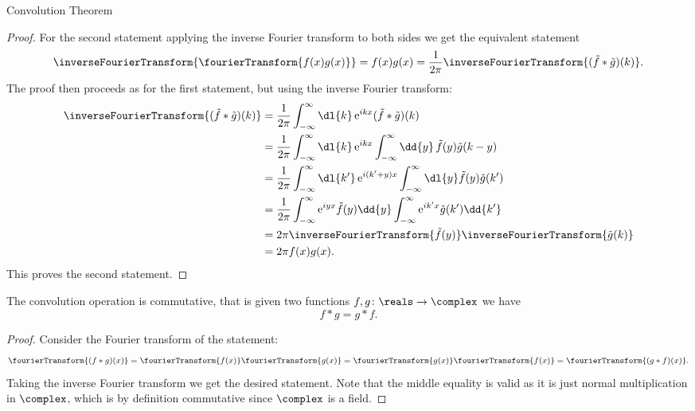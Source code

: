 \documentclass[fleqn]{NotesClass}
\newcommand*{\e}{\mathrm{e}}
\begin{document}
\begin{thm}{Convolution Theorem}{}
\begin{proof}
            For the second statement applying the inverse Fourier transform to both sides we get the equivalent statement
            \begin{equation}
                \inverseFourierTransform\{ \fourierTransform\{ f(x)g(x) \} \} = f(x)g(x) = \frac{1}{2\pi} \inverseFourierTransform\{ (\tilde{f} \ast \tilde{g})(k) \}.
            \end{equation}
            The proof then proceeds as for the first statement, but using the inverse Fourier transform:
            \begin{align}
                \inverseFourierTransform\{ (\tilde{f} \ast \tilde{g})(k) \} &= \frac{1}{2\pi}\int_{-\infty}^{\infty} \dl{k} \, \e^{ikx} (\tilde{f} \ast \tilde{g})(k)\\
                &= \frac{1}{2\pi}\int_{-\infty}^{\infty} \dl{k} \, \e^{ikx} \int_{-\infty}^{\infty} \dd{y} \, \tilde{f}(y)\tilde{g}(k - y)\\
                &= \frac{1}{2\pi}\int_{-\infty}^{\infty} \dl{k'} \, \e^{i(k' + y)x} \int_{-\infty}^{\infty} \dl{y} \tilde{f}(y)\tilde{g}(k')\\
                &= \frac{1}{2\pi} \int_{-\infty}^{\infty} \e^{iyx} \tilde{f}(y) \dd{y} \int_{-\infty}^{\infty} \e^{ik'x} \tilde{g}(k') \dd{k'}\\
                &= 2\pi \inverseFourierTransform\{ \tilde{f}(y) \} \inverseFourierTransform\{ \tilde{g}(k) \}\\
                &= 2\pi f(x)g(x).
            \end{align}
            This proves the second statement.
        \end{proof}
    \end{thm}
    
    \begin{crl}{}{}
        The convolution operation is commutative, that is given two functions \(f, g \colon \reals \to \complex\) we have
        \begin{equation}
            f \ast g = g \ast f.
        \end{equation}
        \begin{proof}
            Consider the Fourier transform of the statement:
            \begin{equation}
                \fourierTransform\{ (f \ast g)(x) \} = \fourierTransform\{ f(x) \} \fourierTransform\{ g(x) \} = \fourierTransform\{ g(x) \} \fourierTransform\{ f(x) \} = \fourierTransform\{ (g \ast f)(x) \}.
            \end{equation}
            Taking the inverse Fourier transform we get the desired statement.
            Note that the middle equality is valid as it is just normal multiplication in \(\complex\), which is by definition commutative since \(\complex\) is a field.
        \end{proof}
    \end{crl}
    
\end{document}

